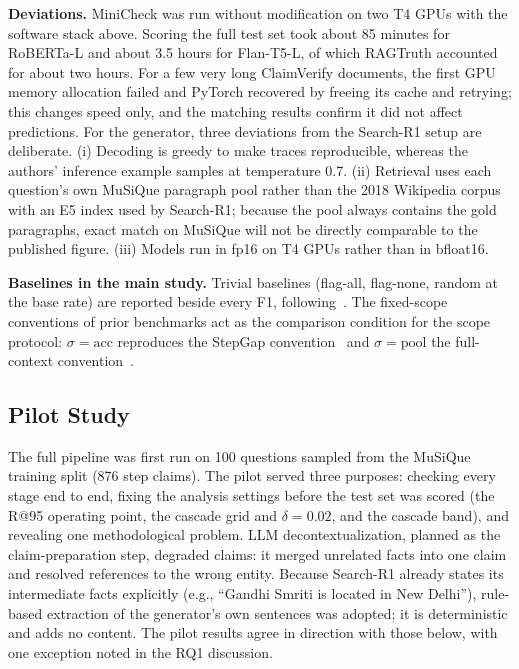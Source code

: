\documentclass[conference]{IEEEtran}
\begin{document}
\textbf{Deviations.} MiniCheck was run without modification on two T4 GPUs with the software stack above. Scoring the full test set took about 85 minutes for RoBERTa-L and about 3.5 hours for Flan-T5-L, of which RAGTruth accounted for about two hours. For a few very long ClaimVerify documents, the first GPU memory allocation failed and PyTorch recovered by freeing its cache and retrying; this changes speed only, and the matching results confirm it did not affect predictions. For the generator, three deviations from the Search-R1 setup are deliberate. (i) Decoding is greedy to make traces reproducible, whereas the authors' inference example samples at temperature 0.7. (ii) Retrieval uses each question's own MuSiQue paragraph pool rather than the 2018 Wikipedia corpus with an E5 index used by Search-R1; because the pool always contains the gold paragraphs, exact match on MuSiQue will not be directly comparable to the published figure. (iii) Models run in fp16 on T4 GPUs rather than in bfloat16.

\textbf{Baselines in the main study.} Trivial baselines (flag-all, flag-none, random at the base rate) are reported beside every F1, following~\cite{ji2026stepgap}. The fixed-scope conventions of prior benchmarks act as the comparison condition for the scope protocol: $\sigma=\mathrm{acc}$ reproduces the StepGap convention~\cite{ji2026stepgap} and $\sigma=\mathrm{pool}$ the full-context convention~\cite{pham2026grace,chu2026locally,kwon2026safe}.

\subsection{Pilot Study}
The full pipeline was first run on 100 questions sampled from the MuSiQue training split (876 step claims). The pilot served three purposes: checking every stage end to end, fixing the analysis settings before the test set was scored (the R@95 operating point, the cascade grid and $\delta=0.02$, and the cascade band), and revealing one methodological problem. LLM decontextualization, planned as the claim-preparation step, degraded claims: it merged unrelated facts into one claim and resolved references to the wrong entity. Because Search-R1 already states its intermediate facts explicitly (e.g., ``Gandhi Smriti is located in New Delhi''), rule-based extraction of the generator's own sentences was adopted; it is deterministic and adds no content. The pilot results agree in direction with those below, with one exception noted in the RQ1 discussion.
\end{document}
